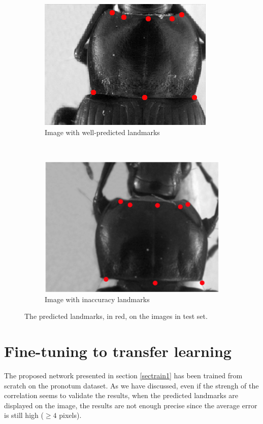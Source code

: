 \documentclass[10pt]{article}
\begin{document}
\begin{figure}[htbp]
    \centering
    \begin{subfigure}[t]{0.25\textwidth}
        \centering
        \includegraphics[scale=1.3]{images/fn_accuracy}
        \caption{\small{Image with well-predicted landmarks}}
        \label{figsub1}
    \end{subfigure}%
    ~ 
    \begin{subfigure}[t]{0.25\textwidth}
        \centering
        \includegraphics[scale=.63]{images/plandmark2}
        \caption{\small{Image with inaccuracy landmarks}}
        \label{figsub2}
    \end{subfigure}
    \caption{\small{The predicted landmarks, in red,  on the images in test set.}}
    \label{figrsexample}
\end{figure}

\section{Fine-tuning to transfer learning}
\label{secimproving}
The proposed network presented in section \ref{sectrain1} has been trained from scratch on the pronotum dataset. As we have discussed, even if the strengh of the correlation seems to validate the results, when the predicted landmarks are displayed on the image, the results are not enough precise since the average error is still high ($\geq 4$ pixels).
\end{document}
